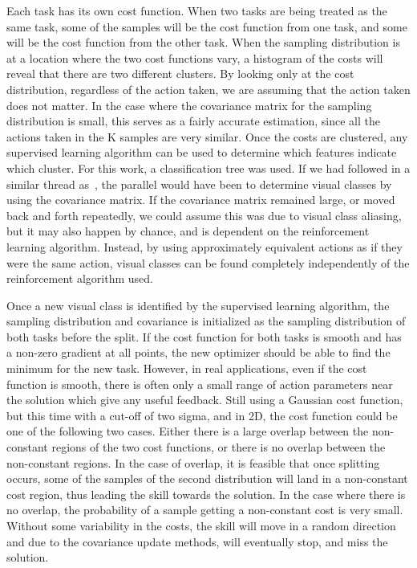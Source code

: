 \documentclass[12pt]{article}
\begin{document}
\color{red}Each task has its own cost function. When two tasks are being treated as the same task, some of the samples will be the cost function from one task, and some will be the cost function from the other task. \color{black} When the sampling distribution is at a location where the two cost functions vary, a histogram of the costs will reveal that there are two different clusters. By looking only at the cost distribution, regardless of the action taken, we are assuming that the action taken does not matter. In the case where the covariance matrix for the sampling distribution is small, this serves as a fairly accurate estimation, since all the actions taken in the K samples are very similar. Once the costs are clustered, any supervised learning algorithm can be used to determine which features indicate which cluster. For this work, a classification tree was used. If we had followed in a similar thread as~\citet{piater11learning}, the parallel would have been to determine visual classes by using the covariance matrix. If the covariance matrix remained large, or moved back and forth repeatedly, we could assume this was due to visual class aliasing, but it may also happen by chance, and is dependent on the reinforcement learning algorithm. Instead, by using approximately equivalent actions as if they were the same action, visual classes can be found completely independently of the reinforcement algorithm used. 

Once a new visual class is identified by the supervised learning algorithm, the sampling distribution and covariance is initialized as the sampling distribution of both tasks before the split. If the cost function for both tasks is smooth and has a non-zero gradient at all points, the new optimizer should be able to find the minimum for the new task. However, in real applications, even if the cost function is smooth, there is often only a small range of action parameters near the solution which give any useful feedback. Still using a Gaussian cost function, but this time with a cut-off of two sigma, and in 2D, the cost function could be one of the following two cases. Either there is a large overlap between the non-constant regions of the two cost functions, or there is no overlap between the non-constant regions. In the case of overlap, it is feasible that once splitting occurs, some of the samples of the second distribution will land in a non-constant cost region, thus leading the skill towards the solution. In the case where there is no overlap, the probability of a sample getting a non-constant cost is very small. Without some variability in the costs, the skill will move in a random direction and due to the covariance update methods, will eventually stop, and miss the solution.
 
\end{document}
